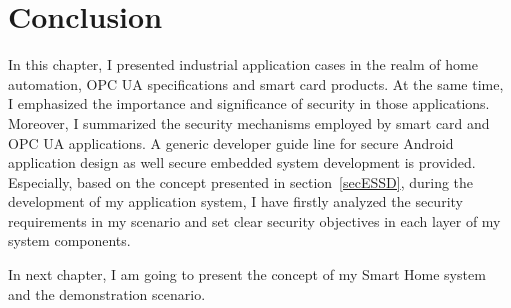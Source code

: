 \section{Conclusion}
In this chapter, I presented industrial application cases in the realm of home automation, OPC UA specifications and smart card products. At the same time, I emphasized the importance and significance of security in those applications. Moreover, I summarized the security mechanisms employed by smart card and OPC UA applications. A generic developer guide line for secure Android application design as well secure embedded system development is provided. Especially, based on the concept presented in section~\ref{secESSD}, during the development of my application system, I have firstly analyzed the security requirements in my scenario and set clear security objectives in each layer of my system components.

In next chapter, I am going to present the concept of my Smart Home system and the demonstration scenario.